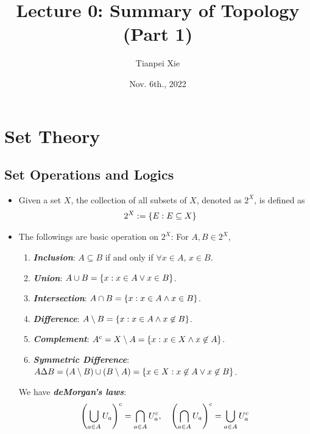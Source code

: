 \documentclass[11pt]{article}
\begin{document}
\title{Lecture 0: Summary of Topology (Part 1)}
\author{ Tianpei Xie}
\date{Nov. 6th., 2022}
\maketitle
\tableofcontents
\newpage
\section{Set Theory}
\subsection{Set Operations and Logics}
\begin{itemize}
\item \begin{definition}
Given a set $X$, the collection of all subsets of $X$, denoted as $2^X$, is defined as
\begin{align*}
2^X &:= \left\{E: E \subseteq X\right\}
\end{align*}
\end{definition}

\item \begin{remark}
The followings are basic operation on $2^X$: For $A, B \in 2^X$,
\begin{enumerate}
\item \emph{\textbf{Inclusion}}:   $A \subseteq B$ if and only if $\forall x \in A$, $x \in B$.
\item \emph{\textbf{Union}}:  $A \cup B = \left\{x: x \in A \lor x \in B\right\}$.
\item \emph{\textbf{Intersection}}:  $A \cap B = \left\{x: x \in A \land x \in B\right\}$.
\item \emph{\textbf{Difference}}:  $A \setminus B = \left\{x: x \in A \land x \not\in B\right\}$.
\item \emph{\textbf{Complement}}: $A^{c} = X \setminus A = \left\{x: x \in X \land x \not\in A\right\}$.
\item \emph{\textbf{Symmetric Difference}}:  $A \Delta B = (A \setminus B) \cup (B \setminus A) = \left\{x \in X: x \not\in A \lor x \not\in B\right\}$.
\end{enumerate}
We have \emph{\textbf{deMorgan's laws}}:
\begin{align*}
\left(\bigcup_{a \in A}U_a\right)^c = \bigcap_{a \in A}U_a^c, \quad \left(\bigcap_{a \in A}U_a\right)^c = \bigcup_{a \in A}U_a^c
\end{align*}
\end{remark}


\end{itemize}
\end{document}
